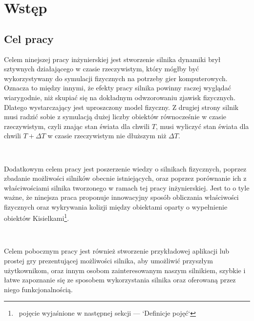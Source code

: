 \chapter{Wstęp}

\section{Cel pracy}
\begin{par}
	Celem ninejszej pracy inżynierskiej jest stworzenie silnika dynamiki brył
	sztywnych działającego w czasie rzeczywistym, który mógłby być wykorzystywany
	do symulacji fizycznych na potrzeby gier komputerowych. Oznacza to między
	innymi, że efekty pracy silnika powinny raczej wyglądać wiarygodnie, niż
	skupiać się na dokładnym odwzorowaniu zjawisk fizycznych. Dlatego wystarczający
	jest uproszczony model fizyczny. Z drugiej strony silnik musi radzić sobie z
	symulacją dużej liczby obiektów równocześnie w czasie rzeczywistym, czyli
	znając stan świata dla chwili $T$, musi wyliczyć stan świata dla chwili
	$T+\Delta{}T$ w czasie rzeczywistym nie dłuższym niż $\Delta{}T$.
\end{par} \\
\begin{par}
	Dodatkowym celem pracy jest poszerzenie wiedzy o silnikach
	fizycznych, poprzez zbadanie możliwości silników obecnie istniejących, oraz
	poprzez porównanie ich z właściwościami silnika tworzonego w ramach tej pracy
	inżynierskiej. Jest to o tyle ważne, że ninejsza praca proponuje innowacyjny
	sposób obliczania właściwości fizycznych oraz wykrywania kolizji między
	obiektami oparty o wypełnienie obiektów Kisielkami\footnote{\ pojęcie
	wyjaśnione w następnej sekcji --- `Definicje pojęć`}.
\end{par} \\
\begin{par}
	Celem pobocznym pracy jest również stworzenie przykładowej aplikacji lub
	prostej gry prezentującej możliwości silnika, aby umożliwić przyszłym
	użytkownikom, oraz innym osobom zainteresowanym naszym silnikiem, szybkie i
	łatwe zapoznanie się ze sposobem wykorzystania silnika oraz oferowaną przez niego funkcjonalnością.
\end{par}

